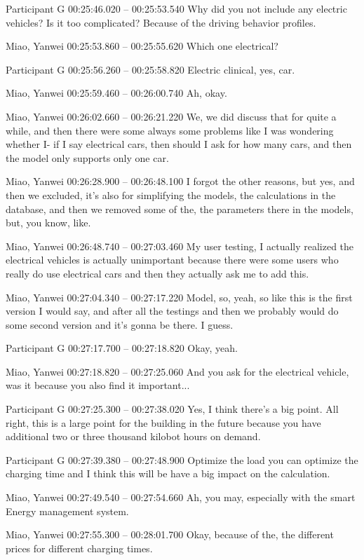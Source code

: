 {Participant G 00:25:46.020 -- 00:25:53.540
Why did you not include any electric vehicles? Is it too complicated? Because of the driving behavior profiles.

Miao, Yanwei 00:25:53.860 -- 00:25:55.620
Which one electrical?

Participant G 00:25:56.260 -- 00:25:58.820
Electric clinical, yes, car.

Miao, Yanwei 00:25:59.460 -- 00:26:00.740
Ah, okay.

Miao, Yanwei 00:26:02.660 -- 00:26:21.220
We, we did discuss that for quite a while, and then there were some always some problems like I was wondering whether I- if I say electrical cars, then should I ask for how many cars, and then the model only supports only one car.

Miao, Yanwei 00:26:28.900 -- 00:26:48.100
I forgot the other reasons, but yes, and then we excluded, it's also for simplifying the models, the calculations in the database, and then we removed some of the, the parameters there in the models, but, you know, like.

Miao, Yanwei 00:26:48.740 -- 00:27:03.460
My user testing, I actually realized the electrical vehicles is actually unimportant because there were some users who really do use electrical cars and then they actually ask me to add this.

Miao, Yanwei 00:27:04.340 -- 00:27:17.220
Model, so, yeah, so like this is the first version I would say, and after all the testings and then we probably would do some second version and it's gonna be there. I guess.

Participant G 00:27:17.700 -- 00:27:18.820
Okay, yeah.

Miao, Yanwei 00:27:18.820 -- 00:27:25.060
And you ask for the electrical vehicle, was it because you also find it important...

Participant G 00:27:25.300 -- 00:27:38.020
Yes, I think there's a big point. All right, this is a large point for the building in the future because you have additional two or three thousand kilobot hours on demand.

Participant G 00:27:39.380 -- 00:27:48.900
Optimize the load you can optimize the charging time and I think this will be have a big impact on the calculation.

Miao, Yanwei 00:27:49.540 -- 00:27:54.660
Ah, you may, especially with the smart Energy management system.

Miao, Yanwei 00:27:55.300 -- 00:28:01.700
Okay, because of the, the different prices for different charging times.

}
